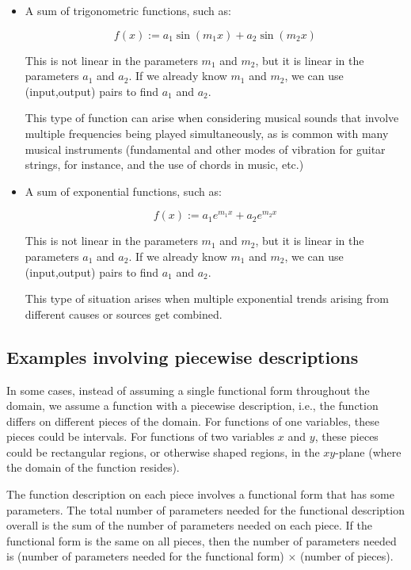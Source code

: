 \documentclass[10pt]{amsart}
\begin{document}
\begin{itemize}
\item A sum of trigonometric functions, such as:

  $$f(x) := a_1 \sin (m_1x) + a_2 \sin(m_2x)$$

  This is not linear in the parameters $m_1$ and $m_2$, but it is
  linear in the parameters $a_1$ and $a_2$. If we already know $m_1$ and
  $m_2$, we can use (input,output) pairs to find $a_1$ and $a_2$.

  This type of function can arise when considering musical sounds that
  involve multiple frequencies being played simultaneously, as is
  common with many musical instruments (fundamental and other modes of
  vibration for guitar strings, for instance, and the use of chords in
  music, etc.)
\item A sum of exponential functions, such as:

  $$f(x) := a_1e^{m_1x} + a_2e^{m_2x}$$

  This is not linear in the parameters $m_1$ and $m_2$, but it is
  linear in the parameters $a_1$ and $a_2$. If we already know $m_1$ and
  $m_2$, we can use (input,output) pairs to find $a_1$ and $a_2$.

  This type of situation arises when multiple exponential trends
  arising from different causes or sources get combined.
\end{itemize}

\subsection{Examples involving piecewise descriptions}

In some cases, instead of assuming a single functional form throughout
the domain, we assume a function with a piecewise description, i.e.,
the function differs on different pieces of the domain. For functions
of one variables, these pieces could be intervals. For functions of
two variables $x$ and $y$, these pieces could be rectangular regions,
or otherwise shaped regions, in the $xy$-plane (where the domain of
the function resides).

The function description on each piece involves a functional form that
has some parameters. The total number of parameters needed for the
functional description overall is the sum of the number of parameters
needed on each piece. If the functional form is the same on all
pieces, then the number of parameters needed is (number of parameters
needed for the functional form) $\times$ (number of pieces).
\end{document}
